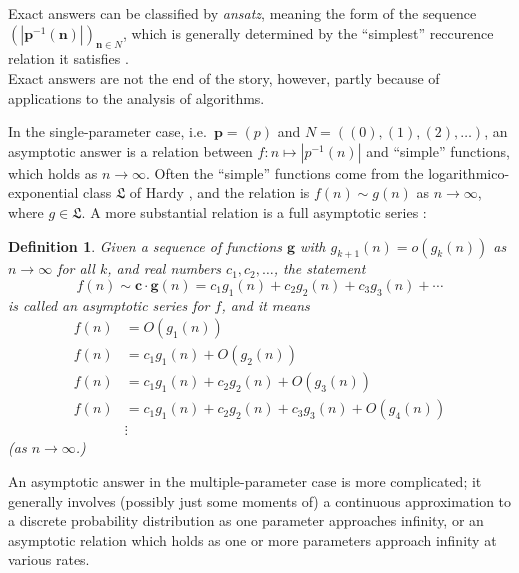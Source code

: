 \documentclass[12pt]{article}
\theoremstyle{plain}
\newtheorem{defin}{Definition}
\begin{document}
\sloppy Exact answers can be classified by \emph{ansatz}, meaning the form of the sequence \( (|\boldsymbol{p}^{-1}(\boldsymbol{n})|)_{ \boldsymbol{n} \in N} \), which is generally determined by the ``simplest'' reccurence relation it satisfies \cite{companion}.
\\

Exact answers are not the end of the story, however, partly because of applications to the analysis of algorithms.

In the single-parameter case, i.e.\ \( \boldsymbol{p} = (p) \) and \( N = ((0), (1), (2), \dots ) \), an asymptotic answer is a relation between \(f:n \mapsto | p^{-1}(n) | \) and ``simple'' functions, which holds as \( n \rightarrow \infty \).
Often the ``simple'' functions come from the logarithmico-exponential class \( \mathfrak{L} \) of Hardy \cite{concrete, hardy1},
and the relation is \( f(n) \sim g(n) \) as \( n \rightarrow \infty \), where \( g \in \mathfrak{L} \).
A more substantial relation is a full asymptotic series \cite{debruijn}:
\begin{defin}
\label{def:asymptoticseries}
Given a sequence of functions \( \boldsymbol{g} \) with \( g_{k+1}(n) = o(g_k(n)) \) as \( n \rightarrow \infty \) for all \(k\), and real numbers \( c_1, c_2, \dots \), the statement
\[ f(n) \sim \boldsymbol{c}\cdot \boldsymbol{g}(n) = c_1 g_1(n) + c_2 g_2(n) + c_3 g_3(n) + \cdots \]
is called an \emph{asymptotic series} for \( f \),
and it means
\begin{align*}
f(n) &= O(g_1(n)) \\
f(n) &= c_1 g_1(n) + O(g_2(n)) \\
f(n) &= c_1 g_1(n) + c_2 g_2(n) + O(g_3(n)) \\
f(n) &= c_1 g_1(n) + c_2 g_2(n) + c_3 g_3(n) + O(g_4(n))\\
&\vdots
\end{align*}
(as \( n \rightarrow \infty \).)
\end{defin}

An asymptotic answer in the multiple-parameter case is more complicated;
it generally involves (possibly just some moments of) a continuous approximation to a discrete probability distribution as one parameter approaches infinity,
or an asymptotic relation which holds as one or more parameters approach infinity at various rates.
\end{document}
